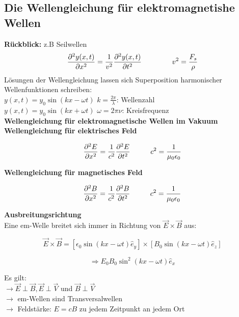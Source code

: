 \begin{flushleft}
\subsection{Die Wellengleichung für elektromagnetishe Wellen}
\textbf{Rückblick:} z.B Seilwellen
\[
    \frac{\partial^2 y(x,t)}{\partial x^2} = \frac{1}{v^2}\frac{\partial^2 y(x,t)}{\partial t^2} \hspace{15mm} v^2 = \frac{F_s}{\rho}
\]
Lösungen der Wellengleichung lassen sich Superposition harmonischer Wellenfunktionen schreiben: \\[1ex]
$y(x,t) = y_0 \sin{(kx - \omega t)}$ \hspace{10mm} $k = \frac{2\pi}{\lambda}$: Wellenzahl \\
$y(x,t) = y_0 \sin{(kx + \omega t)}$ \hspace{10mm} $\omega = 2\pi\nu$: Kreisfrequenz \\[2ex]

\textbf{Wellengleichung für elektromagnetische Wellen im Vakuum} \\[1ex]
\hspace{5mm} \textbf{Wellengleichung für elektrisches Feld}
\begin{formulabox}
    \[
        \frac{\partial^2 E}{\partial x^2} = \frac{1}{c^2}\frac{\partial^2 E}{\partial t^2} \hspace{10mm} c^2 = \frac{1}{\mu_0 \epsilon_0}
    \]
\end{formulabox}

\hspace{5mm} \textbf{Wellengleichung für magnetisches Feld}
\begin{formulabox}
    \[
        \frac{\partial^2 B}{\partial x^2} = \frac{1}{c^2}\frac{\partial^2 B}{\partial t^2} \hspace{10mm} c^2 = \frac{1}{\mu_0 \epsilon_0}
    \]
\end{formulabox}

\textbf{Ausbreitungsrichtung} \\
Eine em-Welle breitet sich immer in Richtung von $\vec{E} \times \vec{B}$ aus:

\[
    \vec{E} \times \vec{B} = [\epsilon_0 \sin{(kx - \omega t)} \hat{e}_y] \times [B_0 \sin{(kx - \omega t)} \hat{e}_z]
\]
\begin{formulabox}
    \[
        \Rightarrow E_0 B_0 \sin^2{(kx - \omega t)\hat{e}_x}
    \]
\end{formulabox}
Es gilt: \\
\hspace{3mm} $\rightarrow \vec{E} \perp \vec{B}, \vec{E} \perp \vec{V}$ und $\vec{B} \perp \vec{V}$ \\
\hspace{3mm} $\rightarrow$ em-Wellen sind Transversalwellen \\
\hspace{3mm} $\rightarrow$ Feldstärke: $E = cB$ zu jedem Zeitpunkt an jedem Ort


\end{flushleft}
